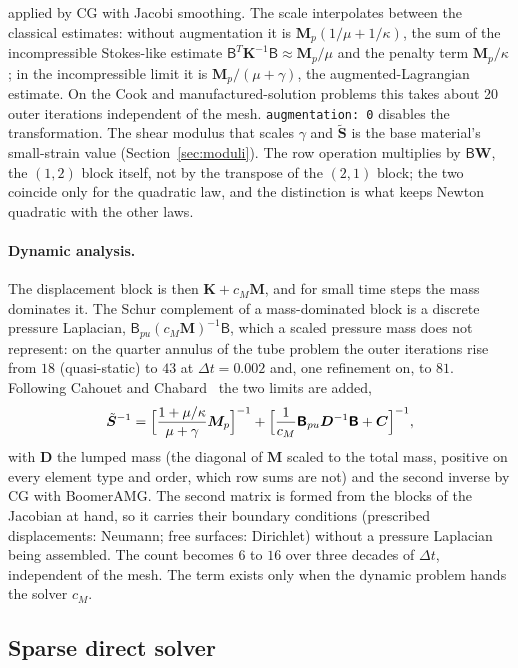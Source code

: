 \documentclass[11pt]{article}
\newcommand{\bS}{\bm{S}}
\newcommand{\bC}{\bm{C}}
\newcommand{\bK}{\bm{K}}
\newcommand{\bM}{\bm{M}}
\newcommand{\bBm}{\bm{\mathsf{B}}}
\DeclareRobustCommand{\code}[1]{{\def\_{\textunderscore\allowbreak}\texttt{#1}}}
\begin{document}
applied by CG with Jacobi smoothing.  The scale interpolates between the
classical estimates: without augmentation it is
$\bM_p(1/\mu + 1/\kappa)$, the sum of the incompressible Stokes-like
estimate $\bBm^T\bK^{-1}\bBm \approx \bM_p/\mu$ and the penalty term
$\bM_p/\kappa$; in the incompressible limit it is $\bM_p/(\mu + \gamma)$,
the augmented-Lagrangian estimate.  On the Cook and manufactured-solution
problems this takes about 20 outer iterations independent of the mesh.
\code{augmentation: 0} disables the transformation.  The shear modulus that
scales $\gamma$ and $\tilde{\bS}$ is the base material's small-strain value
(Section~\ref{sec:moduli}).  The row operation multiplies by $\bBm\bm W$,
the $(1,2)$ block itself, not by the transpose of the $(2,1)$ block; the
two coincide only for the quadratic law, and the distinction is what keeps
Newton quadratic with the other laws.

\paragraph{Dynamic analysis.}
The displacement block is then $\bK + c_M\bM$, and for small time steps the
mass dominates it.  The Schur complement of a mass-dominated block is a
discrete pressure Laplacian, $\bBm_{pu}(c_M\bM)^{-1}\bBm$, which a scaled
pressure mass does not represent: on the quarter annulus of the tube
problem the outer iterations rise from $18$ (quasi-static) to $43$ at
$\Delta t = 0.002$ and, one refinement on, to $81$.  Following Cahouet and
Chabard~\cite{cahouetchabard} the two limits are added,
\begin{equation}
  \tilde{\bS}^{-1} = \Bigl[\frac{1 + \mu/\kappa}{\mu + \gamma}\bM_p\Bigr]^{-1}
  + \Bigl[\frac{1}{c_M}\bBm_{pu}\bm D^{-1}\bBm + \bC\Bigr]^{-1},
\end{equation}
with $\bm D$ the lumped mass (the diagonal of $\bM$ scaled to the total
mass, positive on every element type and order, which row sums are not) and
the second inverse by CG with BoomerAMG.  The second matrix is formed from
the blocks of the Jacobian at hand, so it carries their boundary conditions
(prescribed displacements: Neumann; free surfaces: Dirichlet) without a
pressure Laplacian being assembled.  The count becomes $6$ to $16$ over
three decades of $\Delta t$, independent of the mesh.  The term exists only
when the dynamic problem hands the solver $c_M$.

\subsection{Sparse direct solver}
\label{sec:direct}
\label{sec:directsolver}
\end{document}
